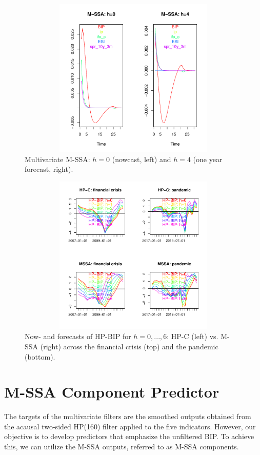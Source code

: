 \documentclass[a4paper]{article}
\begin{document}
\begin{figure}[H]\begin{center}\includegraphics[height=3in, width=4.5in]{./Figures/bk_h.pdf}\caption{Multivariate M-SSA: $h=0$ (nowcast, left) and $h=4$ (one year forecast, right).\label{bk_h}}\end{center}\end{figure}\begin{figure}[H]\begin{center}\includegraphics[height=3in, width=4.5in]{./Figures/multivar_vs_univar.pdf}\caption{Now- and forecasts of HP-BIP for $h=0,...,6$: HP-C (left) vs. M-SSA (right) across the financial crisis (top) and the pandemic (bottom).\label{multivar_vs_univar}}\end{center}\end{figure}


\section{M-SSA Component Predictor}

The targets of the multivariate filters are the smoothed outputs obtained from the acausal two-sided HP(160) filter applied to the five indicators. However, our objective is to develop predictors that emphasize the unfiltered BIP. To achieve this, we can utilize the  M-SSA outputs, referred to as M-SSA components.
\end{document}
